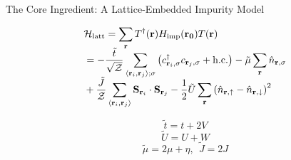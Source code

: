 \documentclass[10pt,aspectratio=169]{beamer}
\begin{document}
\begin{frame}{The Core Ingredient: A Lattice-Embedded Impurity Model}
{\begin{minipage}{0.45\textwidth}
\begin{equation*}\begin{aligned}
	&\mathcal{H}_\text{latt} = \sum_{\bf r} T^\dagger({\bf r}) H_\text{imp}({\bf r_0})T({\bf r}) \\[-5pt]
	&= -\frac{\tilde t}{\sqrt{\mathcal{Z}}} \sum_{\left<{\bf r}_i, {\bf r}_j\right>;\sigma}\left(c^\dagger_{{\bf r}_i,\sigma}c_{{\bf r}_j,\sigma} + \text{h.c.}\right) - \tilde \mu \sum_{{\bf r}}\hat n_{{\bf r},\sigma} \\[-5pt]
	&+ \frac{\tilde J}{\mathcal{Z}}\sum_{\left< {\bf r}_i, {\bf r}_j\right>}{\bf S}_{{\bf r}_i}\cdot{\bf S}_{{\bf r}_j} - \frac{1}{2}\tilde U\sum_{\bf r}\left(\hat n_{{\bf r} , \uparrow} - \hat n_{{\bf r} , \downarrow}\right)^2
\end{aligned}\end{equation*}
\end{minipage}
\hfill
\begin{minipage}{0.18\textwidth}
\[\tilde t = t+2V\]
\[\tilde U = U + W\]
\[\tilde \mu = 2\mu + \eta,~ ~ \tilde J = 2J\]
\end{minipage}
\hfill
{}
}
\end{frame}
\end{document}
